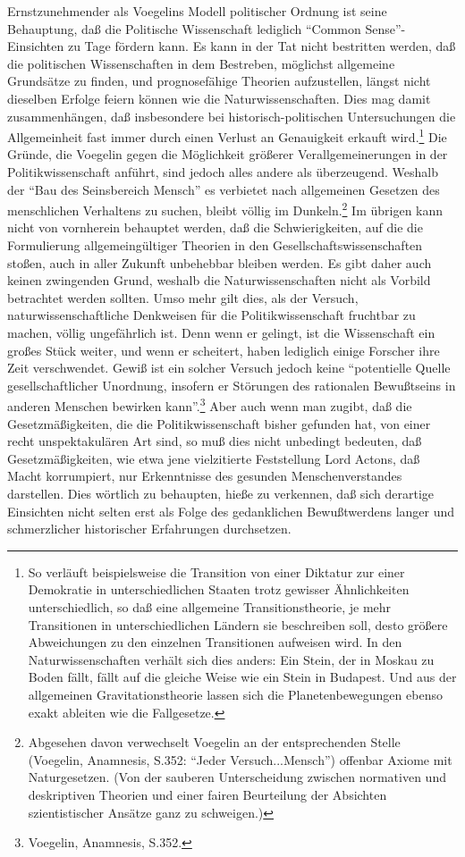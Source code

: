 Ernstzunehmender als Voegelins Modell politischer Ordnung ist seine
Be\-haup\-tung, daß die Politische Wissenschaft lediglich "`Common
Sense"'-Einsichten zu Tage fördern kann. Es kann in der Tat nicht
bestritten werden, daß die politischen Wissenschaften in dem Bestreben,
möglichst allgemeine Grundsätze zu finden, und prognosefähige Theorien
aufzustellen, längst nicht dieselben Erfolge feiern können wie die
Naturwissenschaften. Dies mag damit zusammenhängen, daß insbesondere bei
historisch-politischen Untersuchungen die Allgemeinheit fast immer durch
einen Verlust an Genauigkeit erkauft wird.\footnote{So verläuft
  beispielsweise die Transition von einer Diktatur zur einer Demokratie
  in unterschiedlichen Staaten trotz gewisser Ähnlichkeiten
  unterschiedlich, so daß eine allgemeine Transitionstheorie, je mehr
  Transitionen in unterschiedlichen Ländern sie beschreiben soll, desto
  größere Abweichungen zu den einzelnen Transitionen aufweisen wird. In
  den Naturwissenschaften verhält sich dies anders: Ein Stein, der in
  Moskau zu Boden fällt, fällt auf die gleiche Weise wie ein Stein in
  Budapest. Und aus der allgemeinen Gravitationstheorie lassen sich die
  Planetenbewegungen ebenso exakt ableiten wie die Fallgesetze.} Die
Gründe, die Voegelin gegen die Möglichkeit größerer Verallgemeinerungen
in der Politikwissenschaft anführt, sind jedoch alles andere als
überzeugend. Weshalb der "`Bau des Seinsbereich Mensch"' es verbietet
nach allgemeinen Gesetzen des menschlichen Verhaltens zu suchen, bleibt
völlig im Dunkeln.\footnote{Abgesehen davon verwechselt Voegelin an der
  entsprechenden Stelle (Voegelin, Anamnesis, S.352: "`Jeder
  Versuch...Mensch"') offenbar Axiome mit Naturgesetzen.  (Von der
  sauberen Unterscheidung zwischen normativen und deskriptiven Theorien
  und einer fairen Beurteilung der Absichten szientistischer Ansätze
  ganz zu schweigen.)} Im übrigen kann nicht von vornherein behauptet
werden, daß die Schwierigkeiten, auf die die Formulierung
allgemeingültiger Theorien in den Gesellschaftswissenschaften stoßen,
auch in aller Zukunft unbehebbar bleiben werden. Es gibt daher auch
keinen zwingenden Grund, weshalb die Naturwissenschaften nicht als
Vorbild betrachtet werden sollten. Umso mehr gilt dies, als der Versuch,
naturwissenschaftliche Denkweisen für die Politikwissenschaft fruchtbar
zu machen, völlig ungefährlich ist. Denn wenn er gelingt, ist die
Wissenschaft ein großes Stück weiter, und wenn er scheitert, haben
lediglich einige Forscher ihre Zeit verschwendet. Gewiß ist ein solcher
Versuch jedoch keine "`potentielle Quelle gesellschaftlicher Unordnung,
insofern er Störungen des rationalen Bewußtseins in anderen Menschen
bewirken kann"'.\footnote{Voegelin, Anamnesis, S.352.} Aber auch wenn
man zugibt, daß die Gesetzmäßigkeiten, die die Politikwissenschaft
bisher gefunden hat, von einer recht unspektakulären Art sind, so muß
dies nicht unbedingt bedeuten, daß Gesetzmäßigkeiten, wie etwa jene
vielzitierte Feststellung Lord Actons, daß Macht korrumpiert, nur
Erkenntnisse des gesunden Menschenverstandes darstellen. Dies wörtlich
zu behaupten, hieße zu verkennen, daß sich derartige Einsichten nicht
selten erst als Folge des gedanklichen Bewußtwerdens langer und
schmerzlicher historischer Erfahrungen durchsetzen.

